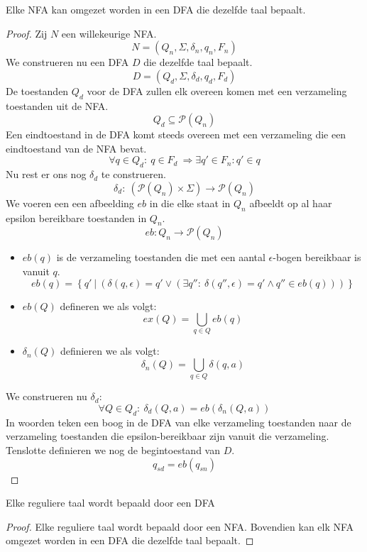 \documentclass[main.tex]{subfiles}
\begin{document}
\begin{st}
  \label{st:nfa-naar-dfa}
  Elke NFA kan omgezet worden in een DFA die dezelfde taal bepaalt.
  
  \begin{proof}
    Zij $N$ een willekeurige NFA.
    \[ N = (Q_{n},\Sigma,\delta_{n},q_{n},F_{n}) \]
    We construeren nu een DFA $D$ die dezelfde taal bepaalt.
    \[ D = (Q_{d},\Sigma,\delta_{d},q_{d},F_{d}) \]
    De toestanden $Q_{d}$ voor de DFA zullen elk overeen komen met een verzameling toestanden uit de NFA.
    \[ Q_d \subseteq \mathcal{P}(Q_{n})\]
    Een eindtoestand in de DFA komt steeds overeen met een verzameling die een eindtoestand van de NFA bevat.
    \[ \forall q\in Q_{d}:\ q\in F_{d}\ \Rightarrow \exists q' \in F_{n}: q' \in q\]
    Nu rest er ons nog $\delta_{d}$ te construeren.
    \[
    \delta_{d}:\ (\mathcal{P}(Q_{n}) \times \Sigma) \rightarrow \mathcal{P}(Q_{n})
    \]
    We voeren een een afbeelding $eb$ in die elke staat in $Q_{n}$ afbeeldt op al haar epsilon bereikbare toestanden in $Q_{n}$.
    \[ eb: Q_{n} \rightarrow \mathcal{P}(Q_{n}) \]
    \begin{itemize}
    \item $eb(q)$ is de verzameling toestanden die met een aantal $\epsilon$-bogen bereikbaar is vanuit $q$.
      \[ eb(q) = \left\{ q'\ |\ (\delta(q,\epsilon) = q' \vee (\exists q'':\ \delta(q'',\epsilon) = q' \wedge q'' \in eb(q) )) \right\} \]
    \item $eb(Q)$ defineren we als volgt:
      \[ ex(Q) = \bigcup_{q\in Q} eb(q)\]
    \item $\delta_{n}(Q)$ definieren we als volgt:
      \[ \delta_{n}(Q) = \bigcup_{q\in Q} \delta(q,a) \]
    \end{itemize}
    We construeren nu $\delta_{d}$:
    \[ \forall Q\in Q_{d}:\ \delta_{d}(Q,a) = eb(\delta_{n}(Q,a)) \]
    In woorden teken een boog in de DFA van elke verzameling toestanden naar de verzameling toestanden die epsilon-bereikbaar zijn vanuit die verzameling.
    Tenslotte definieren we nog de begintoestand van $D$.
    \[ q_{sd} = eb(q_{sn}) \]
  \end{proof}
\end{st}

\begin{st}
  \label{gev:reguliere-taal-DFA}
  Elke reguliere taal wordt bepaald door een DFA
  
  \begin{proof}
    Elke reguliere taal wordt bepaald door een NFA.
    Bovendien kan elk NFA omgezet worden in een DFA die dezelfde taal bepaalt.
  \end{proof}
\end{st}
\end{document}
